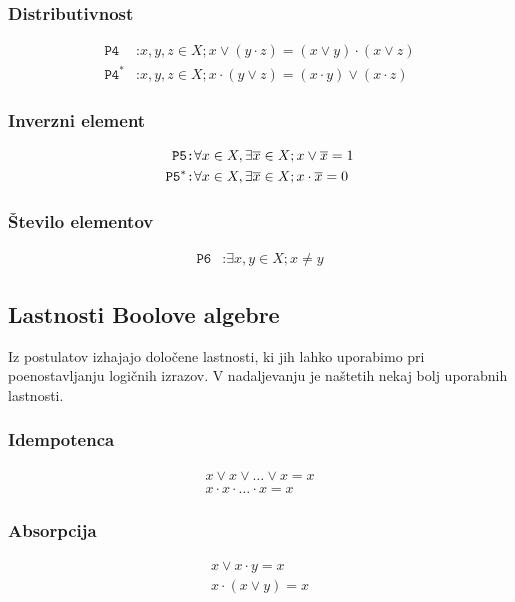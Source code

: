 \subsubsection*{Distributivnost}
\begin{align*}
\texttt{P4}&\texttt{:}x,y,z \in X; x \vee \left(y \cdot z \right) = \left(x \vee y\right) \cdot \left( x \vee z\right)\\
\texttt{P4}^*&\texttt{:}x,y,z \in X; x \cdot \left(y \vee z \right) = \left(x \cdot y\right) \vee \left( x \cdot z\right)
\end{align*}

\subsubsection*{Inverzni element}
\begin{align*}
\texttt{P5}&\texttt{:}\forall x \in X, \exists \overline x \in X; x \vee \overline x = 1\\
\texttt{P5}^*&\texttt{:}\forall x \in X, \exists \overline x \in X; x \cdot \overline x = 0
\end{align*}

\subsubsection*{Število elementov}
\begin{align*}
\texttt{P6}&\texttt{:}\exists x,y \in X; x \neq y
\end{align*}

\subsection{Lastnosti Boolove algebre}
Iz postulatov izhajajo določene lastnosti, ki jih lahko uporabimo pri poenostavljanju logičnih izrazov. V nadaljevanju je naštetih nekaj bolj uporabnih lastnosti.
\subsubsection*{Idempotenca}
\begin{align*}
x \vee x \vee \dots \vee x = x\\
x \cdot x \cdot \dots \cdot x = x
\end{align*}

\subsubsection*{Absorpcija}
\begin{align*}
x \vee x \cdot y = x\\
x \cdot \left( x \vee y\right) = x
\end{align*}

